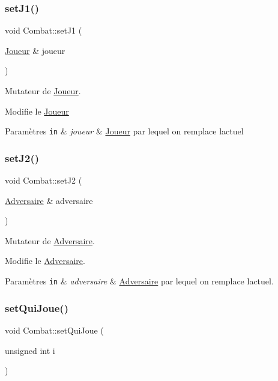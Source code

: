 \subsubsection{\texorpdfstring{set\+J1()}{setJ1()}}
{\footnotesize\ttfamily void Combat\+::set\+J1 (\begin{DoxyParamCaption}\item[{\hyperlink{class_joueur}{Joueur} \&}]{joueur }\end{DoxyParamCaption})}



Mutateur de \hyperlink{class_joueur}{Joueur}. 

Modifie le \hyperlink{class_joueur}{Joueur} 
\begin{DoxyParams}[1]{Paramètres}
\mbox{\tt in}  & {\em joueur} & \hyperlink{class_joueur}{Joueur} par lequel on remplace l\textquotesingle{}actuel \\
\hline
\end{DoxyParams}
\mbox{\label{class_combat_a2093b3be4975b62aa546d54f108834f3}} 
\subsubsection{\texorpdfstring{set\+J2()}{setJ2()}}
{\footnotesize\ttfamily void Combat\+::set\+J2 (\begin{DoxyParamCaption}\item[{\hyperlink{class_adversaire}{Adversaire} \&}]{adversaire }\end{DoxyParamCaption})}



Mutateur de \hyperlink{class_adversaire}{Adversaire}. 

Modifie le \hyperlink{class_adversaire}{Adversaire}. 
\begin{DoxyParams}[1]{Paramètres}
\mbox{\tt in}  & {\em adversaire} & \hyperlink{class_adversaire}{Adversaire} par lequel on remplace l\textquotesingle{}actuel. \\
\hline
\end{DoxyParams}
\mbox{\label{class_combat_a292caf86cb2c8ecbf9ecd055e6a028c0}} 
\subsubsection{\texorpdfstring{set\+Qui\+Joue()}{setQuiJoue()}}
{\footnotesize\ttfamily void Combat\+::set\+Qui\+Joue (\begin{DoxyParamCaption}\item[{unsigned int}]{i }\end{DoxyParamCaption})}



